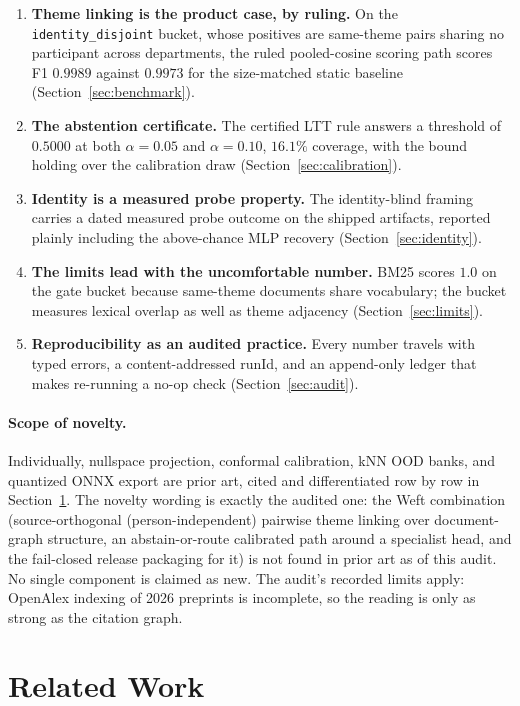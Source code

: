 \documentclass{article}
\begin{document}
\begin{enumerate}
    \item \textbf{Theme linking is the product case, by ruling.} On the \texttt{identity\_disjoint} bucket, whose positives are same-theme pairs sharing no participant across departments, the ruled pooled-cosine scoring path scores F1 $0.9989$ against $0.9973$ for the size-matched static baseline (Section~\ref{sec:benchmark}).
    \item \textbf{The abstention certificate.} The certified LTT rule answers a threshold of $0.5000$ at both $\alpha=0.05$ and $\alpha=0.10$, $16.1\%$ coverage, with the bound holding over the calibration draw (Section~\ref{sec:calibration}).
    \item \textbf{Identity is a measured probe property.} The identity-blind framing carries a dated measured probe outcome on the shipped artifacts, reported plainly including the above-chance MLP recovery (Section~\ref{sec:identity}).
    \item \textbf{The limits lead with the uncomfortable number.} BM25 scores $1.0$ on the gate bucket because same-theme documents share vocabulary; the bucket measures lexical overlap as well as theme adjacency (Section~\ref{sec:limits}).
    \item \textbf{Reproducibility as an audited practice.} Every number travels with typed errors, a content-addressed runId, and an append-only ledger that makes re-running a no-op check (Section~\ref{sec:audit}).
\end{enumerate}

\paragraph{Scope of novelty.}
Individually, nullspace projection, conformal calibration, kNN OOD banks, and quantized ONNX export are prior art, cited and differentiated row by row in Section~\ref{sec:related}. The novelty wording is exactly the audited one: the Weft combination (source-orthogonal (person-independent) pairwise theme linking over document-graph structure, an abstain-or-route calibrated path around a specialist head, and the fail-closed release packaging for it) is not found in prior art as of this audit. No single component is claimed as new. The audit's recorded limits apply: OpenAlex indexing of 2026 preprints is incomplete, so the reading is only as strong as the citation graph.

\section{Related Work}
\label{sec:related}
\end{document}
